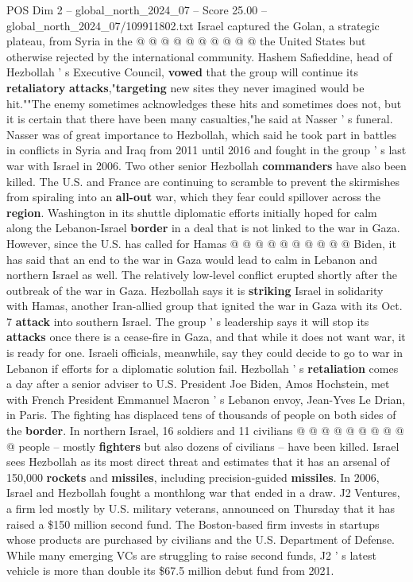 \begin{textsample}{POS Dim 2 – global\_north\_2024\_07 – Score 25.00 – global\_north\_2024\_07/109911802.txt}
Israel captured the Golan, a strategic plateau, from Syria in the @ @ @ @ @ @ @ @ @ @ the United States but otherwise rejected by the international community.
Hashem Safieddine, head of Hezbollah ' s Executive Council, \textbf{vowed} that the group will continue its \textbf{retaliatory} \textbf{attacks},"\textbf{targeting} new sites they never imagined would be hit.""The enemy sometimes acknowledges these hits and sometimes does not, but it is certain that there have been many casualties,"he said at Nasser ' s funeral.
Nasser was of great importance to Hezbollah, which said he took part in battles in conflicts in Syria and Iraq from 2011 until 2016 and fought in the group ' s last war with Israel in 2006.
Two other senior Hezbollah \textbf{commanders} have also been killed.
The U.S. and France are continuing to scramble to prevent the skirmishes from spiraling into an \textbf{all-out} war, which they fear could spillover across the \textbf{region}.
Washington in its shuttle diplomatic efforts initially hoped for calm along the Lebanon-Israel \textbf{border} in a deal that is not linked to the war in Gaza.
However, since the U.S. has called for Hamas @ @ @ @ @ @ @ @ @ @ Biden, it has said that an end to the war in Gaza would lead to calm in Lebanon and northern Israel as well.
The relatively low-level conflict erupted shortly after the outbreak of the war in Gaza.
Hezbollah says it is \textbf{striking} Israel in solidarity with Hamas, another Iran-allied group that ignited the war in Gaza with its Oct. 7 \textbf{attack} into southern Israel.
The group ' s leadership says it will stop its \textbf{attacks} once there is a cease-fire in Gaza, and that while it does not want war, it is ready for one.
Israeli officials, meanwhile, say they could decide to go to war in Lebanon if efforts for a diplomatic solution fail.
Hezbollah ' s \textbf{retaliation} comes a day after a senior adviser to U.S.
President Joe Biden, Amos Hochstein, met with French President Emmanuel Macron ' s Lebanon envoy, Jean-Yves Le Drian, in Paris.
The fighting has displaced tens of thousands of people on both sides of the \textbf{border}.
In northern Israel, 16 soldiers and 11 civilians @ @ @ @ @ @ @ @ @ @ people -- mostly \textbf{fighters} but also dozens of civilians -- have been killed.
Israel sees Hezbollah as its most direct threat and estimates that it has an arsenal of 150,000 \textbf{rockets} and \textbf{missiles}, including precision-guided \textbf{missiles}.
In 2006, Israel and Hezbollah fought a monthlong war that ended in a draw.
J2 Ventures, a firm led mostly by U.S. military veterans, announced on Thursday that it has raised a \$150 million second fund.
The Boston-based firm invests in startups whose products are purchased by civilians and the U.S.
Department of Defense.
While many emerging VCs are struggling to raise second funds, J2 ' s latest vehicle is more than double its \$67.5 million debut fund from 2021.

\end{textsample}
